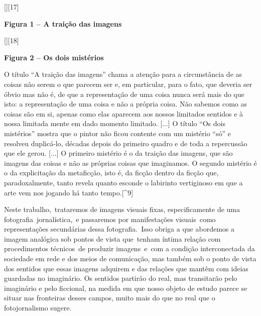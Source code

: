 \documentclass[
  letterpaper,
  a4paper,
  12pt]{scrbook}
\renewenvironment{quote}
  {\par\singlespacing\small\list{}{\rightmargin=0cm \leftmargin=4cm}%
   \item\relax}
  {\endlist}
\begin{document}
{[}{]}{[}17{]}

\protect\hypertarget{_Toc507740886}{}{}\textbf{Figura 1 -- A traição das
imagens}

{[}{]}{[}18{]}

\protect\hypertarget{_Toc507740887}{}{}\textbf{Figura 2 -- Os dois
mistérios}

\begin{quote}
O título ``A traição das imagens'' chama a atenção para a circunstância
de as coisas não serem o que parecem ser e, em particular, para o fato,
que deveria ser óbvio mas não é, de que a representação de uma coisa
nunca será mais do que isto: a representação de uma coisa e não a
própria coisa. Não sabemos como as coisas são em si, apenas como elas
aparecem aos nossos limitados sentidos e à nossa limitada mente em dado
momento limitado. {[}...{]} O título ``Os dois mistérios'' mostra que o
pintor não ficou contente com um mistério ``só'' e resolveu duplicá-lo,
décadas depois do primeiro quadro e de toda a repercussão que ele gerou.
{[}...{]} O primeiro mistério é o da traição das imagens, que são
imagens das coisas e não as próprias coisas que imaginamos. O segundo
mistério é o da explicitação da metaficção, isto é, da ficção dentro da
ficção que, paradoxalmente, tanto revela quanto esconde o labirinto
vertiginoso em que a arte vem nos jogando há tanto tempo.{[}\^{}9{]}
\end{quote}

Neste trabalho,~trataremos de imagens visuais fixas, especificamente de
uma fotografia~jornalística,~e passaremos por manifestações visuais~como
representações secundárias dessa fotografia.~Isso obriga a que abordemos
a imagem analógica sob pontos de vista que~tenham íntima relação com
procedimentos técnicos~de produzir imagens~e~com a condição
interconectada da sociedade em rede e dos meios de comunicação, mas
também sob o ponto de vista dos sentidos que essas imagens adquirem e
das relações que mantêm com ideias guardadas no imaginário. Os sentidos
partirão do real, mas transitarão pelo imaginário e pelo ficcional, na
medida em que nosso objeto de estudo parece se situar nas fronteiras
desses campos, muito mais do que no real que o fotojornalismo sugere.
\end{document}
